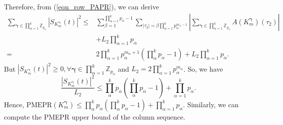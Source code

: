 \documentclass[pdflatex,sn-mathphys-num]{sn-jnl}%
\theoremstyle{thmstyleone}
\begin{document}
	Therefore, from (\ref{eqn_row_PAPR}), we can derive
	\begin{equation}
		\begin{split}
			\sum_{\bm{\gamma} \in \prod_{\alpha=1}^{k} \mathbb{Z}_{p_\alpha}}^{} \left|  S_{K^{\bm{\gamma}}_m} (t) \right|^2
			\leq &\sum_{ \beta=1}^{\prod_{\alpha=1}^{k} p_\alpha-1}  \sum_{ \left| \tau_2 \right| = \beta \prod_{\alpha=1}^{k} p_\alpha^{m_\alpha-1}}^{} \left| \sum_{\bm{\gamma} \in \prod_{\alpha=1}^{k} \mathbb{Z}_{p_\alpha}}^{}  A(K^{\bm{\gamma}}_m) (\tau_2) \right| \\
			&+  L_2  \prod_{\alpha=1}^{k} p_\alpha \\
			= & 2 \prod_{\alpha=1}^{k} p_\alpha^{m_\alpha+1}  \left(\prod_{\alpha}^{k} p_\alpha-1\right) + L_2 \prod_{\alpha=1}^{k} p_\alpha.
		\end{split}
	\end{equation}
	But $\left| S_{K^{\bm{\gamma}}_m} (t)  \right|^2 \geq 0, \forall \bm{\gamma} \in \prod_{\alpha=1}^{k} \mathbb{Z}_{p_\alpha}$ and $L_2 = 2\prod_{\alpha=1}^{k} p_\alpha^{m_\alpha}$. So,  we have
	\begin{equation}
		\frac{\left| S_{K^{\bm{\gamma}}_m} (t)\right|^2}{L_2} \leq \prod_{\alpha}^{k} p_\alpha \left(\prod_{\alpha}^{k} p_\alpha-1\right) + \prod_{\alpha=1}^{k} p_\alpha.
	\end{equation}
	Hence, $\text{PMEPR}(K^{\bm{\gamma}}_m) \leq \prod_{\alpha}^{k} p_\alpha  \left(\prod_{\alpha}^{k} p_\alpha-1\right) + \prod_{\alpha=1}^{k} p_\alpha $.
	Similarly, we can compute the PMEPR upper bound of the column sequence.
	
	
	
\end{document}
